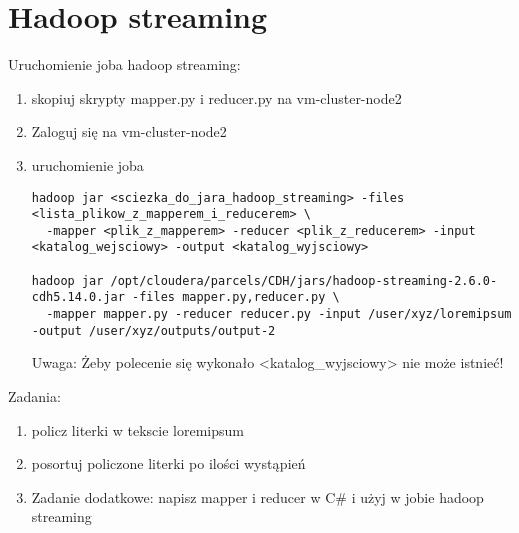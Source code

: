 \documentclass{article}
\begin{document}
\section*{Hadoop streaming}

Uruchomienie joba hadoop streaming:
\begin{enumerate}
\item skopiuj skrypty mapper.py i reducer.py na vm-cluster-node2
\item Zaloguj się na vm-cluster-node2
\item uruchomienie joba
\begin{lstlisting}[]
hadoop jar <sciezka_do_jara_hadoop_streaming> -files <lista_plikow_z_mapperem_i_reducerem> \
  -mapper <plik_z_mapperem> -reducer <plik_z_reducerem> -input <katalog_wejsciowy> -output <katalog_wyjsciowy>

hadoop jar /opt/cloudera/parcels/CDH/jars/hadoop-streaming-2.6.0-cdh5.14.0.jar -files mapper.py,reducer.py \
  -mapper mapper.py -reducer reducer.py -input /user/xyz/loremipsum -output /user/xyz/outputs/output-2
\end{lstlisting}

Uwaga: Żeby polecenie się wykonało <katalog\_wyjsciowy> nie może istnieć!
\end{enumerate}

Zadania:
\begin{enumerate}
\item policz literki w tekscie loremipsum
\item posortuj policzone literki po ilości wystąpień
\item Zadanie dodatkowe: napisz mapper i reducer w C\# i użyj w jobie hadoop streaming 
\end{enumerate}
\end{document}
